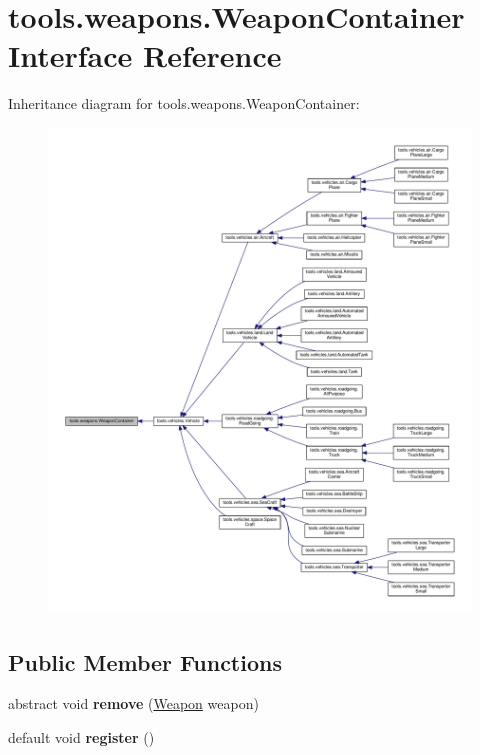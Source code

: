\hypertarget{interfacetools_1_1weapons_1_1_weapon_container}{}\section{tools.\+weapons.\+Weapon\+Container Interface Reference}
\label{interfacetools_1_1weapons_1_1_weapon_container}


Inheritance diagram for tools.\+weapons.\+Weapon\+Container\+:\nopagebreak
\begin{figure}[H]
\begin{center}
\leavevmode
\includegraphics[width=350pt]{interfacetools_1_1weapons_1_1_weapon_container__inherit__graph}
\end{center}
\end{figure}
\subsection*{Public Member Functions}
\begin{DoxyCompactItemize}
\item 
abstract void {\bfseries remove} (\hyperlink{classtools_1_1weapons_1_1_weapon}{Weapon} weapon)\hypertarget{interfacetools_1_1weapons_1_1_weapon_container_af129aab055f13fd383fd5d20c5e1e88e}{}\label{interfacetools_1_1weapons_1_1_weapon_container_af129aab055f13fd383fd5d20c5e1e88e}

\item 
default void {\bfseries register} ()\hypertarget{interfacetools_1_1weapons_1_1_weapon_container_a24a8b8689a7f31659543b82304bb7a7e}{}\label{interfacetools_1_1weapons_1_1_weapon_container_a24a8b8689a7f31659543b82304bb7a7e}

\end{DoxyCompactItemize}


